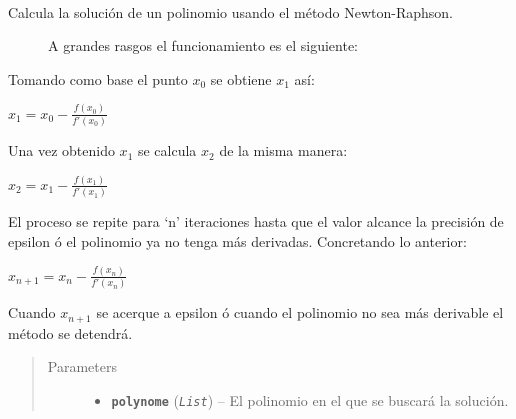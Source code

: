 \documentclass[letterpaper,10pt,english]{sphinxmanual}
\begin{document}

\begin{fulllineitems}
\label{Model/Fitness/NonLinearRankingFitness:Model.Fitness.NonLinearRankingFitness.calculate_root}~\begin{description}
\item[{Calcula la solución de un polinomio usando el método Newton-Raphson.}] \leavevmode
A grandes rasgos el funcionamiento es el siguiente:

\end{description}

\begin{DUlineblock}{0em}
\item[] Tomando como base el punto \(x_0\) se obtiene \(x_1\) así:
\end{DUlineblock}

\begin{center}\(x_1 = x_0 - \frac{f(x_0)}{f'(x_0)}\)
\end{center}
\begin{DUlineblock}{0em}
\item[] Una vez obtenido \(x_1\) se calcula \(x_2\) de la misma manera:
\end{DUlineblock}

\begin{center}\(x_2 = x_1 - \frac{f(x_1)}{f'(x_1)}\)
\end{center}
\begin{DUlineblock}{0em}
\item[] El proceso se repite para `n' iteraciones hasta que el valor alcance la
precisión de epsilon ó el polinomio ya no tenga más derivadas. Concretando lo anterior:
\end{DUlineblock}

\begin{center}\(x_{n+1} = x_n - \frac{f(x_n)}{f'(x_n)}\)
\end{center}
\begin{DUlineblock}{0em}
\item[] Cuando \(x_{n+1}\) se acerque a epsilon ó cuando el
polinomio no sea más derivable el método se detendrá.
\end{DUlineblock}
\begin{quote}\begin{description}
\item[{Parameters}] \leavevmode\begin{itemize}
\item {} 
\textbf{\texttt{polynome}} (\emph{\texttt{List}}) -- El polinomio en el que se buscará la solución.


\end{itemize}
\end{description}
\end{quote}
\end{fulllineitems}
\end{document}
